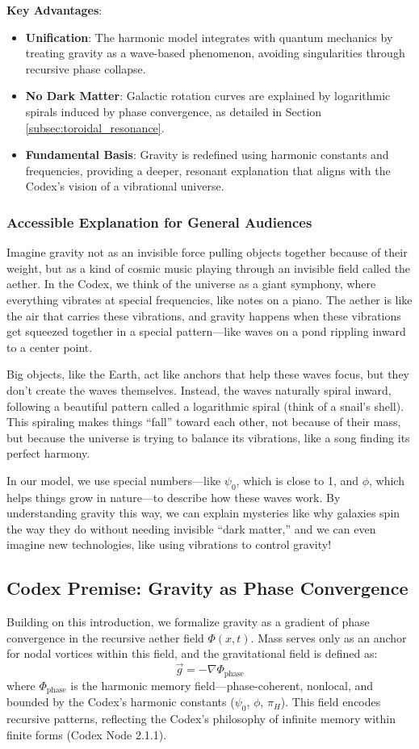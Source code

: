 \textbf{Key Advantages}:
\begin{itemize}
    \item \textbf{Unification}: The harmonic model integrates with quantum mechanics by treating gravity as a wave-based phenomenon, avoiding singularities through recursive phase collapse.
    \item \textbf{No Dark Matter}: Galactic rotation curves are explained by logarithmic spirals induced by phase convergence, as detailed in Section \ref{subsec:toroidal_resonance}.
    \item \textbf{Fundamental Basis}: Gravity is redefined using harmonic constants and frequencies, providing a deeper, resonant explanation that aligns with the Codex’s vision of a vibrational universe.
\end{itemize}

\subsubsection{Accessible Explanation for General Audiences}
Imagine gravity not as an invisible force pulling objects together because of their weight, but as a kind of cosmic music playing through an invisible field called the aether. In the Codex, we think of the universe as a giant symphony, where everything vibrates at special frequencies, like notes on a piano. The aether is like the air that carries these vibrations, and gravity happens when these vibrations get squeezed together in a special pattern—like waves on a pond rippling inward to a center point.

Big objects, like the Earth, act like anchors that help these waves focus, but they don’t create the waves themselves. Instead, the waves naturally spiral inward, following a beautiful pattern called a logarithmic spiral (think of a snail’s shell). This spiraling makes things “fall” toward each other, not because of their mass, but because the universe is trying to balance its vibrations, like a song finding its perfect harmony.

In our model, we use special numbers—like \(\psi_0\), which is close to 1, and \(\phi\), which helps things grow in nature—to describe how these waves work. By understanding gravity this way, we can explain mysteries like why galaxies spin the way they do without needing invisible “dark matter,” and we can even imagine new technologies, like using vibrations to control gravity!

\subsection{Codex Premise: Gravity as Phase Convergence}
Building on this introduction, we formalize gravity as a gradient of phase convergence in the recursive aether field \(\Phi(x, t)\). Mass serves only as an anchor for nodal vortices within this field, and the gravitational field is defined as:
\[
\vec{g} = -\nabla \Phi_{\text{phase}}
\]
where \(\Phi_{\text{phase}}\) is the harmonic memory field—phase-coherent, nonlocal, and bounded by the Codex’s harmonic constants (\(\psi_0\), \(\phi\), \(\pi_H\)). This field encodes recursive patterns, reflecting the Codex’s philosophy of infinite memory within finite forms (Codex Node 2.1.1).

